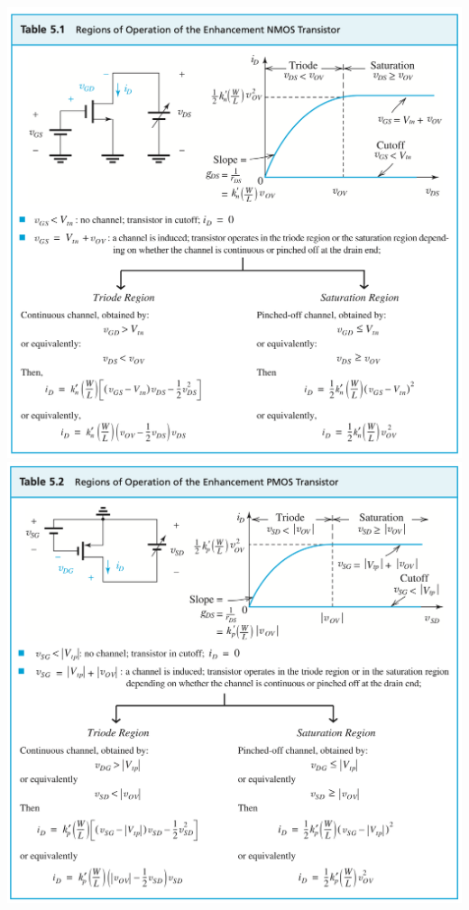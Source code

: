 \documentclass[12pt]{article}
\begin{document}
    \begin{center}
        \includegraphics[scale=0.5]{figures/fig18.png}
        \includegraphics[scale=0.5]{figures/fig17.png}
    \end{center}
\end{document}
